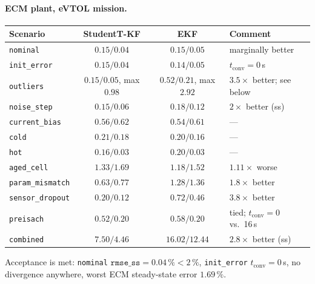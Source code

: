 \paragraph{ECM plant, eVTOL mission.}
\begin{center}\small
\begin{tabular}{@{}lccl@{}}
\toprule
Scenario & StudentT-KF & EKF & Comment\\
\midrule
\texttt{nominal}        & $0.15/\mathbf{0.04}$ & $0.15/0.05$ & marginally better\\
\texttt{init\_error}    & $0.15/\mathbf{0.04}$ & $0.14/0.05$ & $t_\mathrm{conv}=0$\,s\\
\texttt{outliers}       & $\mathbf{0.15/0.05}$, max $0.98$ & $0.52/0.21$, max $2.92$
  & $\mathbf{3.5\times}$ better; see below\\
\texttt{noise\_step}    & $\mathbf{0.15/0.06}$ & $0.18/0.12$ & $2\times$ better (ss)\\
\texttt{current\_bias}  & $0.56/0.62$ & $0.54/0.61$ & ---\\
\texttt{cold}           & $0.21/0.18$ & $0.20/0.16$ & ---\\
\texttt{hot}            & $0.16/0.03$ & $0.20/0.03$ & ---\\
\texttt{aged\_cell}     & $1.33/1.69$ & $1.18/1.52$ & $1.11\times$ worse\\
\texttt{param\_mismatch}& $\mathbf{0.63/0.77}$ & $1.28/1.36$ & $\mathbf{1.8\times}$ better\\
\texttt{sensor\_dropout}& $\mathbf{0.20/0.12}$ & $0.72/0.46$ & $\mathbf{3.8\times}$ better\\
\texttt{preisach}       & $\mathbf{0.52/0.20}$ & $0.58/0.20$ & tied; $t_\mathrm{conv}=0$ vs.\ 16\,s\\
\texttt{combined}       & $\mathbf{7.50/4.46}$ & $16.02/12.44$ & $\mathbf{2.8\times}$ better (ss)\\
\bottomrule
\end{tabular}
\end{center}
Acceptance is met: \texttt{nominal} $\texttt{rmse\_ss}=0.04\,\%<2\,\%$, \texttt{init\_error}
$t_\mathrm{conv}=0$\,s, no divergence anywhere, worst ECM steady-state error $1.69\,\%$.

